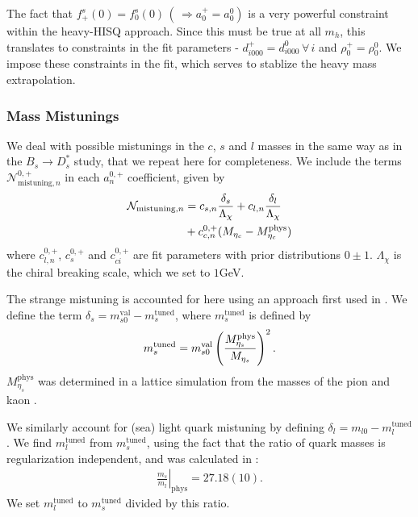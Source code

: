 The fact that $f^s_+(0) = f^s_0(0) \,(\,\Rightarrow a^+_0 = a^0_0)$ is a very powerful constraint within the heavy-HISQ approach. Since this must be true at all $m_h$, this translates to constraints in the fit parameters - $d^+_{i000}=d^0_{i000} \,\forall \,i$ and $\rho^+_0 = \rho^0_0$. We impose these constraints in the fit, which serves to stablize the heavy mass extrapolation.

\subsubsection{Mass Mistunings}

We deal with possible mistunings in the $c$, $s$ and $l$ masses in the same way as in the $B_s\to D_s^*$ study, that we repeat here for completeness. We include the terms $\mathcal{N}_{\text{mistuning},n}^{0,+}$ in each $a^{0,+}_n$ coefficient, given by
\begin{align}
  \mathcal{N}_{\text{mistuning},n} &= c_{s,n} {\delta_s\over \Lambda_{\chi}} + c_{l,n} {\delta_l\over \Lambda_{\chi}}
    \label{eq:mistuning}
  \\ &+c_{c,n}^{0,+} (M_{\eta_c} - M_{\eta_c}^{\text{phys}})
  \nonumber
\end{align}
where $c^{0,+}_{l,n}$, $c^{0,+}_s$ and $c^{0,+}_{ci}$ are fit parameters with prior distributions $0\pm 1$. $\Lambda_{\chi}$ is the chiral breaking scale, which we set to $1$GeV.

The strange mistuning is accounted for here using an approach first used in \cite{Chakraborty:2014aca}. We define the term $\delta_s = m^{\text{val}}_{s0} - m_s^{\text{tuned}}$, where $m_s^{\text{tuned}}$ is defined by
\begin{align}
  m_s^{\text{tuned}} = m^{\text{val}}_{s0} \left({ M^{\text{phys}}_{\eta_s} \over M_{\eta_s} }\right)^2.
\end{align}
$M_{\eta_s}^{\text{phys}}$ was determined in a lattice simulation from the masses of the pion and kaon \cite{Dowdall:2013rya}.

We similarly account for (sea) light quark mistuning by defining $\delta_l = m_{l0} - m_l^{\text{tuned}}$. We find $m_l^{\text{tuned}}$ from $m_s^{\text{tuned}}$, using the fact that the ratio of quark masses is regularization independent, and was calculated in \cite{Bazavov:2014wgs}:
\begin{align}
  \left.\frac{m_s}{m_l}\right\rvert_{\textrm{phys}} = 27.18(10).
\end{align}
We set $m_l^{\text{tuned}}$ to $m_s^{\text{tuned}}$ divided by this ratio.

